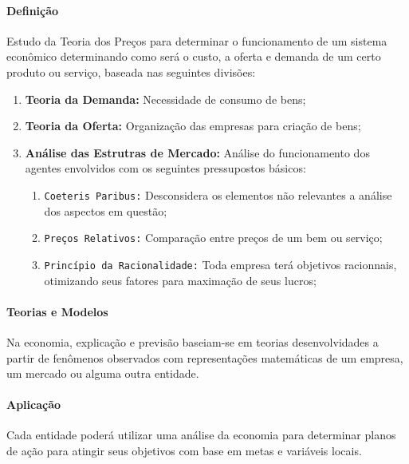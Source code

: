 \documentclass{article}
\begin{document}
            \paragraph{Definição}Estudo da Teoria dos Preços para determinar o funcionamento de um sistema econômico determinando como será o custo, a oferta e demanda de um certo produto ou serviço, baseada nas seguintes divisões:
                \begin{enumerate}[noitemsep, rightmargin = \leftmargin]
                    \item \textbf{Teoria da Demanda:} Necessidade de consumo de bens;

                    \item \textbf{Teoria da Oferta:} Organização das empresas para criação de bens;

                    \item \textbf{Análise das Estrutras de Mercado:} Análise do funcionamento dos agentes envolvidos com os seguintes pressupostos básicos:
                        \begin{enumerate}[noitemsep, rightmargin = \leftmargin]
                            \item \texttt{Coeteris Paribus:} Desconsidera os elementos não relevantes a análise dos aspectos em questão; 
                            \item \texttt{Preços Relativos:} Comparação entre preços de um bem ou serviço;
                            \item \texttt{Princípio da Racionalidade:} Toda empresa terá objetivos racionnais, otimizando seus fatores para maximação de seus lucros;
                        \end{enumerate}
                \end{enumerate}

            \paragraph{Teorias e Modelos}Na economia, explicação e previsão baseiam-se em teorias desenvolvidades a partir de fenômenos observados com representações matemáticas de um empresa, um mercado ou alguma outra entidade.

            \paragraph{Aplicação}Cada entidade poderá utilizar uma análise da economia para determinar planos de ação para atingir seus objetivos com base em metas e variáveis locais.
\end{document}
